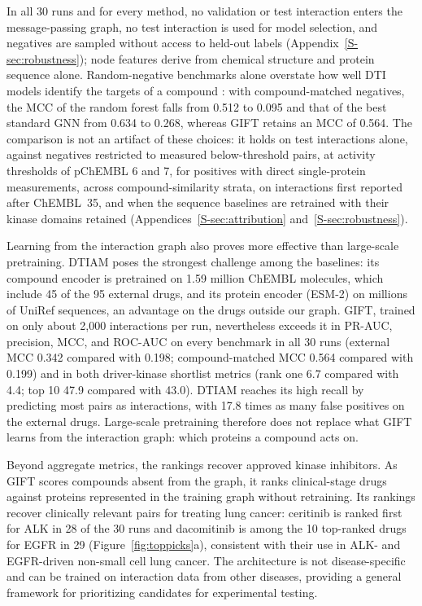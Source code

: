 \documentclass[10pt,letterpaper]{article}
\begin{document}
In all 30 runs and for every method, no validation or test interaction enters the message-passing graph, no test interaction is used for model selection, and negatives are sampled without access to held-out labels (Appendix~\ref{S-sec:robustness}); node features derive from chemical structure and protein sequence alone. Random-negative benchmarks alone overstate how well DTI models identify the targets of a compound \cite{pahikkala2015toward}: with compound-matched negatives, the MCC of the random forest falls from 0.512 to 0.095 and that of the best standard GNN from 0.634 to 0.268, whereas GIFT retains an MCC of 0.564. The comparison is not an artifact of these choices: it holds on test interactions alone, against negatives restricted to measured below-threshold pairs, at activity thresholds of pChEMBL 6 and 7, for positives with direct single-protein measurements, across compound-similarity strata, on interactions first reported after ChEMBL~35, and when the sequence baselines are retrained with their kinase domains retained (Appendices~\ref{S-sec:attribution} and~\ref{S-sec:robustness}).

Learning from the interaction graph also proves more effective than large-scale pretraining. DTIAM poses the strongest challenge among the baselines: its compound encoder is pretrained on 1.59 million ChEMBL molecules, which include 45 of the 95 external drugs, and its protein encoder (ESM-2) on millions of UniRef sequences, an advantage on the drugs outside our graph. GIFT, trained on only about 2,000 interactions per run, nevertheless exceeds it in PR-AUC, precision, MCC, and ROC-AUC on every benchmark in all 30 runs (external MCC 0.342 compared with 0.198; compound-matched MCC 0.564 compared with 0.199) and in both driver-kinase shortlist metrics (rank one 6.7 compared with 4.4; top 10 47.9 compared with 43.0). DTIAM reaches its high recall by predicting most pairs as interactions, with 17.8 times as many false positives on the external drugs. Large-scale pretraining therefore does not replace what GIFT learns from the interaction graph: which proteins a compound acts on.


Beyond aggregate metrics, the rankings recover approved kinase inhibitors. As GIFT scores compounds absent from the graph, it ranks clinical-stage drugs against proteins represented in the training graph without retraining. Its rankings recover clinically relevant pairs for treating lung cancer: ceritinib is ranked first for ALK in 28 of the 30 runs and dacomitinib is among the 10 top-ranked drugs for EGFR in 29 (Figure~\ref{fig:toppicks}a), consistent with their use in ALK- and EGFR-driven non-small cell lung cancer. The architecture is not disease-specific and can be trained on interaction data from other diseases, providing a general framework for prioritizing candidates for experimental testing.
\end{document}
